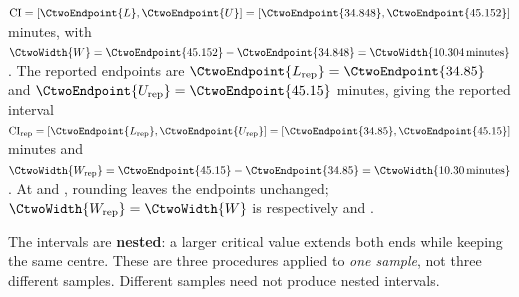 $\mathrm{CI}=[\CtwoEndpoint{L},\CtwoEndpoint{U}]=[\CtwoEndpoint{34.848},\CtwoEndpoint{45.152}]$ minutes,
with $\CtwoWidth{W}=\CtwoEndpoint{45.152}-\CtwoEndpoint{34.848}=\CtwoWidth{10.304\,\text{minutes}}$.
The reported endpoints are $\CtwoEndpoint{L_{\rm rep}}=\CtwoEndpoint{34.85}$ and
$\CtwoEndpoint{U_{\rm rep}}=\CtwoEndpoint{45.15}$ minutes, giving the reported interval
$\mathrm{CI}_{\rm rep}=[\CtwoEndpoint{L_{\rm rep}},\CtwoEndpoint{U_{\rm rep}}]=[\CtwoEndpoint{34.85},\CtwoEndpoint{45.15}]$ minutes and
$\CtwoWidth{W_{\rm rep}}=\CtwoEndpoint{45.15}-\CtwoEndpoint{34.85}=\CtwoWidth{10.30\,\text{minutes}}$.
At  and , rounding leaves the endpoints unchanged;
$\CtwoWidth{W_{\rm rep}}=\CtwoWidth{W}$ is respectively  and .

The intervals are \textbf{nested}: a larger critical value extends both ends while
keeping the same centre. These are three procedures applied to \emph{one sample},
not three different samples. Different samples need not produce nested intervals.
\par\vspace{3mm}

\clearpage

